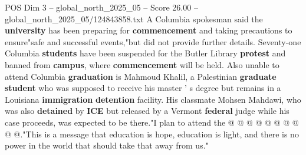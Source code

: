 \begin{textsample}{POS Dim 3 – global\_north\_2025\_05 – Score 26.00 – global\_north\_2025\_05/124843858.txt}
A Columbia spokesman said the \textbf{university} has been preparing for \textbf{commencement} and taking precautions to ensure"safe and successful events,"but did not provide further details.
Seventy-one Columbia \textbf{students} have been suspended for the Butler Library \textbf{protest} and banned from \textbf{campus}, where \textbf{commencement} will be held.
Also unable to attend Columbia \textbf{graduation} is Mahmoud Khalil, a Palestinian \textbf{graduate} \textbf{student} who was supposed to receive his master ' s degree but remains in a Louisiana \textbf{immigration} \textbf{detention} facility.
His classmate Mohsen Mahdawi, who was also \textbf{detained} by \textbf{ICE} but released by a Vermont \textbf{federal} judge while his case proceeds, was expected to be there."I plan to attend the @ @ @ @ @ @ @ @ @ @."This is a message that education is hope, education is light, and there is no power in the world that should take that away from us."

\end{textsample}
